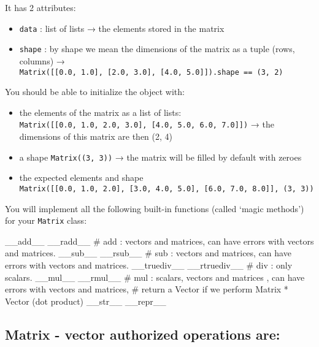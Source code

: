 \documentclass[]{article}
\newenvironment{Shaded}{\begin{snugshade}}{\end{snugshade}}
\newcommand{\CommentTok}[1]{\textcolor[rgb]{0.48,0.49,0.49}{#1}}
\newcommand{\FunctionTok}[1]{\textcolor[rgb]{0.56,0.27,0.68}{#1}}
\begin{document}
It has 2 attributes:

\begin{itemize}
\item
  \texttt{data} : list of lists → the elements stored in the matrix
\item
  \texttt{shape} : by shape we mean the dimensions of the matrix as a
  tuple (rows, columns) →
  \texttt{Matrix({[}{[}0.0,\ 1.0{]},\ {[}2.0,\ 3.0{]},\ {[}4.0,\ 5.0{]}{]}).shape\ ==\ (3,\ 2)}
\end{itemize}

You should be able to initialize the object with:

\begin{itemize}
\item
  the elements of the matrix as a list of lists:
  \texttt{Matrix({[}{[}0.0,\ 1.0,\ 2.0,\ 3.0{]},\ {[}4.0,\ 5.0,\ 6.0,\ 7.0{]}{]})}
  → the dimensions of this matrix are then (2, 4)
\item
  a shape \texttt{Matrix((3,\ 3))} → the matrix will be filled by
  default with zeroes
\item
  the expected elements and shape
  \texttt{Matrix({[}{[}0.0,\ 1.0,\ 2.0{]},\ {[}3.0,\ 4.0,\ 5.0{]},\ {[}6.0,\ 7.0,\ 8.0{]}{]},\ (3,\ 3))}
\end{itemize}

You will implement all the following built-in functions (called `magic
methods') for your \texttt{Matrix} class:

\begin{Shaded}
\begin{Highlighting}[]
    \FunctionTok{__add__}
    \FunctionTok{__radd__}
    \CommentTok{# add : vectors and matrices, can have errors with vectors and matrices.}
    \FunctionTok{__sub__}
    \FunctionTok{__rsub__}
    \CommentTok{# sub : vectors and matrices, can have errors with vectors and matrices.}
    \FunctionTok{__truediv__}
    \FunctionTok{__rtruediv__}
    \CommentTok{# div : only scalars.}
    \FunctionTok{__mul__}
    \FunctionTok{__rmul__}
    \CommentTok{# mul : scalars, vectors and matrices , can have errors with vectors and matrices, }
    \CommentTok{# return a Vector if we perform Matrix * Vector (dot product)}
    \FunctionTok{__str__}
    \FunctionTok{__repr__}
\end{Highlighting}
\end{Shaded}

\hypertarget{matrix---vector-authorized-operations-are}{%
\subsection{Matrix - vector authorized operations
are:}\label{matrix---vector-authorized-operations-are}}
\end{document}
